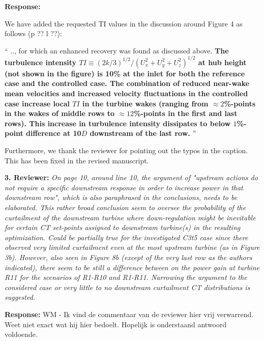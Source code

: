 \documentclass[]{article}
\begin{document}
\textbf{Response: }

We have added the requested TI values in the discussion around Figure 4 as follows (p ?? l ??):

``
.., for which an enhanced recovery was found as discussed above. \textbf{The turbulence intensity $TI \equiv (2k/3  )^{1/2}/(U_x^2+U_y^2+U_z^2)^{1/2}$ at hub height (not shown in the figure) is 10\% at the inlet for both the reference case and the controlled case. The combination of reduced near-wake mean velocities and increased velocity fluctuations in the controlled case increase local $TI$ in the turbine wakes (ranging from $\approx 2$\%-points in the wakes of middle rows to $\approx 12$\%-points in the first and last rows). This increase in turbulence intensity dissipates to below $1$\%-point difference at 10$D$ downstream of the last row.}
''

Furthermore, we thank the reviewer for pointing out the typos in the caption. This has been fixed in the revised manuscript.

\dotfill

\textbf{3. Reviewer: } \textit{On page 10, around line 10, the argument of "upstream actions do not require a
	specific downstream response in order to increase power in that downstream row",
	which is also paraphrased in the conclusions, needs to be elaborated. This rather
	broad conclusion seem to oversee the probability of the curtailment of the downstream
	turbine where down-regulation might be inevitable for certain CT set-points assigned
	to downstream turbine(s) in the resulting optimization. Could be partially true for the
	investigated C3t5 case since there observed very limited curtailment even at the most
	upstream turbine (as in Figure 3b). However, also seen in Figure 8b (except of the
	very last row as the authors indicated), there seem to be still a difference between on
	the power gain at turbine R11 for the scenarios of R1-R10 and R1-R11. Narrowing the argument to the considered case or very little to no downstream curtailment CT
	distributions is suggested.}

\textbf{Response: } WM - Ik vind de commentaar van de reviewer hier vrij verwarrend. Weet niet exact wat hij hier bedoelt. Hopelijk is onderstaand antwoord voldoende. 
\end{document}
